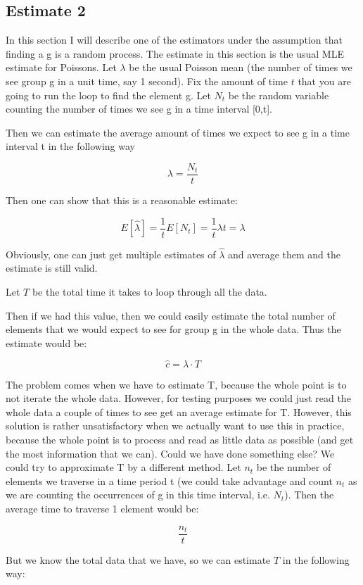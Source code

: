 \documentclass[a4paper]{article}
\begin{document}
\subsection{Estimate 2}

In this section I will describe one of the estimators under the assumption that finding a g is a random process.
The estimate in this section is the usual MLE estimate for Poissons.
Let $\lambda$ be the usual Poisson mean (the number of times we see group g in a unit time, say 1 second).
Fix the amount of time $t$ that you are going to run the loop to find the element g.
Let $N_t$ be the random variable counting the number of times we see g in a time interval [0,t].

Then we can estimate the average amount of times we expect to see g in a time interval t in the following way

$$ \lambda = \frac{N_t}{t}$$

Then one can show that this is a reasonable estimate:

$$E[\hat{\lambda}] =\frac{1}{t}E[N_t]=\frac{1}{t}\lambda t=\lambda$$

Obviously, one can just get multiple estimates of $\hat{\lambda}$ and average them and the estimate is still valid.

Let $T$ be the total time it takes to loop through all the data.

Then if we had this value, then we could easily estimate the total number of elements that we would expect to see for group g in the whole data. Thus the estimate would be:

$$\hat{c} = \lambda \cdot T$$

The problem comes when we have to estimate T, because the whole point is to not iterate the whole data.
However, for testing purposes we could just read the whole data a couple of times to see get an average estimate for T.
However, this solution is rather unsatisfactory when we actually want to use this in practice, because the whole point is to process and read as little data as possible (and get the most information that we can). 
Could we have done something else?
We could try to approximate T by a different method.
Let $n_t$ be the number of elements we traverse in a time period t (we could take advantage and count $n_t$ as we are counting the occurrences of g in this time interval, i.e. $N_t$).
Then the average time to traverse 1 element would be:

$$\frac{n_t}{t}$$

But we know the total data that we have, so we can estimate $T$ in the following way:
\end{document}
